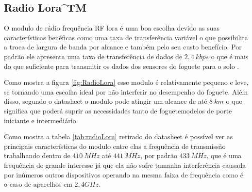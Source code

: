 \newpage
\subsection{Radio Lora^{TM}}





O modulo de rádio frequência RF lora é uma boa escolha devido as suas características benéficas como uma taxa de transferência variável o que possibilita a troca de largura de banda por alcance e também pelo seu custo benefício. Por padrão ele apresenta uma taxa de transferência de dados de $2,4 \ kbps$ o que é mais do que suficiente para transmitir os dados dos sensores do foguete para o solo \cite{EBYTE2019}. 

Como mostra a figura \ref{fig:RadioLora} esse modulo é relativamente pequeno e leve, se tornando uma escolha ideal por não interferir no desempenho do foguete. Além disso, segundo o datasheet o modulo pode atingir um alcance de até $8 \ km$ o que significa que poderá suprir as necessidades tanto de foguetemodelos de porte iniciante e intermediário.




Como mostra a tabela \ref{tab:radioLora} retirado do datasheet é possível ver as principais características do modulo entre elas a frequência de transmissão trabalhando dentro de $410 \ MHz$ até $441 \ MHz$, por padrão $433 \ MHz$, que é uma frequência de grande interesse já que ela não sofre tamanha interferência causada por inúmeros outros dispositivos operando na mesma faixa de frequência como é o caso de aparelhos em $2,4 GHz$.



